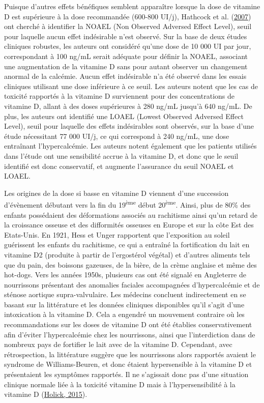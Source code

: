 \documentclass[
  a4paper,
  DIV=11,
  numbers=noendperiod,
  listof=totoc]{scrreprt}
\begin{document}
Puisque d'autres effets bénéfiques semblent apparaître lorsque la dose
de vitamine D est supérieure à la dose recommandée (600-800 UI/j),
Hathcock et al. (\protect\hyperlink{ref-Hathcock.20072gf}{2007}) ont
cherché à identifier la NOAEL (Non Observed Adversed Effect Level),
seuil pour laquelle aucun effet indésirable n'est observé. Sur la base
de deux études cliniques robustes, les auteurs ont considéré qu'une dose
de 10 000 UI par jour, correspondant à 100 ng/mL serait adéquate pour
définir la NOAEL, associant une augmentation de la vitamine D sans pour
autant observer un changement anormal de la calcémie. Aucun effet
indésirable n'a été observé dans les essais cliniques utilisant une dose
inférieure à ce seuil. Les auteurs notent que les cas de toxicité
rapportés à la vitamine D surviennent pour des concentrations de
vitamine D, allant à des doses supérieures à 280 ng/mL jusqu'à 640
ng/mL. De plus, les auteurs ont identifié une LOAEL (Lowest Observed
Adversed Effect Level), seuil pour laquelle des effets indésirables sont
observés, sur la base d'une étude nécessitant 77 000 UI/j, ce qui
correspond à 240 ng/mL, une dose entraînant l'hypercalcémie. Les auteurs
notent également que les patients utilisés dans l'étude ont une
sensibilité accrue à la vitamine D, et donc que le seuil identifié est
donc conservatif, et augmente l'assurance du seuil NOAEL et LOAEL.

Les origines de la dose si basse en vitamine D viennent d'une succession
d'évènement débutant vers la fin du 19\textsuperscript{ème} début
20\textsuperscript{ème}. Ainsi, plus de 80\% des enfants possédaient des
déformations associés au rachitisme ainsi qu'un retard de la croissance
osseuse et des difformités osseuses en Europe et sur la côte Est des
Etats-Unis. En 1921, Hess et Unger rapportent que l'exposition au soleil
guérissent les enfants du rachitisme, ce qui a entraîné la fortification
du lait en vitamine D2 (produite à partir de l'ergostérol végétal) et
d'autres aliments tels que du pain, des boissons gazeuses, de la bière,
de la crème anglaise et même des hot-dogs. Vers les années 1950s,
plusieurs cas ont été signalé en Angleterre de nourrissons présentant
des anomalies faciales accompagnées d'hypercalcémie et de sténose
aortique supra-valvulaire. Les médecins concluent indirectement en se
basant sur la littérature et les données cliniques disponibles qu'il
s'agit d'une intoxication à la vitamine D. Cela a engendré un mouvement
contraire où les recommandations sur les doses de vitamine D ont été
établies conservativement afin d'éviter l'hypercalcémie chez les
nourrissons, ainsi que l'interdiction dans de nombreux pays de fortifier
le lait avec de la vitamine D. Cependant, avec rétrospection, la
littérature suggère que les nourrissons alors rapportés avaient le
syndrome de Williams-Beuren, et donc étaient hypersensible à la vitamine
D et présentaient les symptômes rapportés. Il ne s'agissait donc pas
d'une situation clinique normale liée à la toxicité vitamine D mais à
l'hypersensibilité à la vitamine D
(\protect\hyperlink{ref-Holick.2015}{Holick, 2015}).
\end{document}
